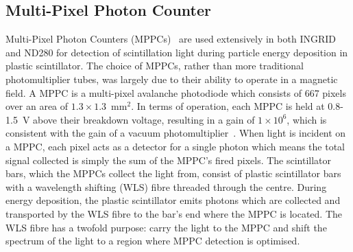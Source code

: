 \subsection{Multi-Pixel Photon Counter}
\label{subsec:MPPC}
Multi-Pixel Photon Counters (MPPCs)~\cite{1748-0221-4-04-P04004} are used extensively in both INGRID and ND280 for detection of scintillation light during particle energy deposition in plastic scintillator.  The choice of MPPCs, rather than more traditional photomultiplier tubes, was largely due to their ability to operate in a magnetic field.  A MPPC is a multi-pixel avalanche photodiode which consists of 667 pixels over an area of $1.3\times1.3$~mm$^2$.  In terms of operation, each MPPC is held at 0.8-1.5~V above their breakdown voltage, resulting in a gain of $1\times10^6$, which is consistent with the gain of a vacuum photomultiplier~\cite{Abe2011106}.  When light is incident on a MPPC, each pixel acts as a detector for a single photon which means the total signal collected is simply the sum of the MPPC's fired pixels.
\newline
\newline
The scintillator bars, which the MPPCs collect the light from, consist of plastic scintillator bars with a wavelength shifting (WLS) fibre threaded through the centre.  During energy deposition, the plastic scintillator emits photons which are collected and transported by the WLS fibre to the bar's end where the MPPC is located.  The WLS fibre has a twofold purpose: carry the light to the MPPC and shift the spectrum of the light to a region where MPPC detection is optimised.

